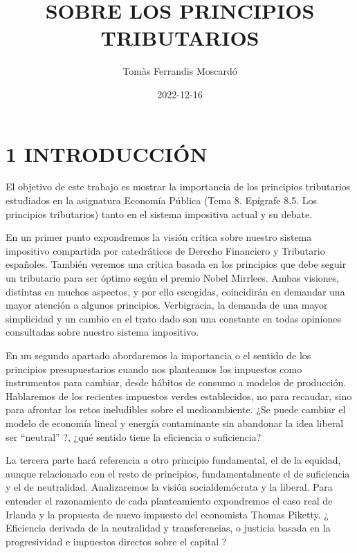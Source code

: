 \documentclass[
]{article}
\title{SOBRE LOS PRINCIPIOS TRIBUTARIOS}
\author{Tomàs Ferrandis Moscardó}
\date{2022-12-16}
\begin{document}
\maketitle

{
\setcounter{tocdepth}{2}
\tableofcontents
}
\hypertarget{introducciuxf3n}{%
\section*{1 INTRODUCCIÓN}\label{introducciuxf3n}}

El objetivo de este trabajo es mostrar la importancia de los principios
tributarios estudiados en la asignatura Economía Pública (Tema 8.
Epígrafe 8.5. Los principios tributarios) tanto en el sistema impositiva
actual y su debate.

En un primer punto expondremos la visión crítica sobre nuestro sistema
impositivo compartida por catedráticos de Derecho Financiero y
Tributario españoles. También veremos una crítica basada en los
principios que debe seguir un tributario para ser óptimo según el premio
Nobel Mirrlees. Ambas visiones, distintas en muchos aspectos, y por ello
escogidas, coincidirán en demandar una mayor atención a algunos
principios. Verbigracia, la demanda de una mayor simplicidad y un cambio
en el trato dado son una constante en todas opiniones consultadas sobre
nuestro sistema impositivo.

En un segundo apartado abordaremos la importancia o el sentido de los
principios presupuestarios cuando nos planteamos los impuestos como
instrumentos para cambiar, desde hábitos de consumo a modelos de
producción. Hablaremos de los recientes impuestos verdes establecidos,
no para recaudar, sino para afrontar los retos ineludibles sobre el
medioambiente. ¿Se puede cambiar el modelo de economía lineal y energía
contaminante sin abandonar la idea liberal ser ``neutral'' ?, ¿qué
sentido tiene la eficiencia o suficiencia?

La tercera parte hará referencia a otro principio fundamental, el de la
equidad, aunque relacionado con el resto de principios, fundamentalmente
el de suficiencia y el de neutralidad. Analizaremos la visión
socialdemócrata y la liberal. Para entender el razonamiento de cada
planteamiento expondremos el caso real de Irlanda y la propuesta de
nuevo impuesto del economista Thomas Piketty. ¿ Eficiencia derivada de
la neutralidad y transferencias, o justicia basada en la progresividad e
impuestos directos sobre el capital ?
\end{document}
